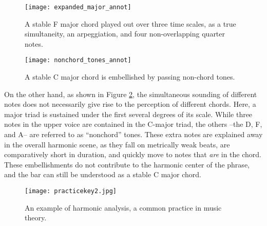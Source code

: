 \begin{figure}[t]
\centering
\texttt{[image: expanded\_major\_annot]}
\caption{A stable F major chord played out over three time scales, as a true simultaneity, an arpeggiation, and four non-overlapping quarter notes.}
\label{fig:expanded_major}
\end{figure}

\begin{figure}[t]
\centering
\texttt{[image: nonchord\_tones\_annot]}
\caption{A stable C major chord is embellished by passing non-chord tones.}
\label{fig:nonchord_tones}
\end{figure}

On the other hand, as shown in Figure \ref{fig:nonchord_tones}, the simultaneous sounding of different notes does not necessarily give rise to the perception of different chords.
Here, a major triad is sustained under the first several degrees of its scale.
While three notes in the upper voice are contained in the C-major triad, the others --the D, F, and A-- are referred to as ``nonchord'' tones.
These extra notes are explained away in the overall harmonic scene, as they fall on metrically weak beats, are comparatively short in duration, and quickly move to notes that \emph{are} in the chord.
These embellishments do not contribute to the harmonic center of the phrase, and the bar can still be understood as a stable C major chord.


\begin{figure}[t]
\centering
\texttt{[image: practicekey2.jpg]}
\caption{An example of harmonic analysis, a common practice in music theory.}
\label{fig:mthomework}
\end{figure}


